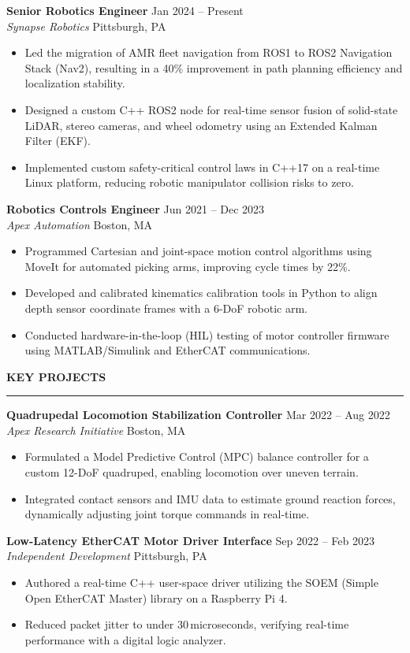 \documentclass[10pt,letterpaper]{article}
\newcommand{\cvsection}[1]{%
  \vspace{6pt}%
  \phantomsection
  {\color{accent}\large\bfseries\MakeUppercase{#1}}%
  \vspace{1pt}%
  \par\noindent\textcolor{accent}{\rule{\linewidth}{1pt}}%
  \vspace{4pt}%
}
\newcommand{\cventry}[4]{%
  \noindent
  \begin{minipage}[t]{\linewidth}
    \textbf{#1} \hfill {\color{secondary}\small #2} \\
    \textit{#3} \hfill {\color{secondary}\small #4}
  \end{minipage}%
  \vspace{2pt}%
}
\begin{document}
\cventry{Senior Robotics Engineer}{Jan 2024 -- Present}{Synapse Robotics}{Pittsburgh, PA}
\begin{itemize}
  \item Led the migration of AMR fleet navigation from ROS1 to ROS2 Navigation Stack (Nav2), resulting in a 40\% improvement in path planning efficiency and localization stability.
  \item Designed a custom C++ ROS2 node for real-time sensor fusion of solid-state LiDAR, stereo cameras, and wheel odometry using an Extended Kalman Filter (EKF).
  \item Implemented custom safety-critical control laws in C++17 on a real-time Linux platform, reducing robotic manipulator collision risks to zero.
\end{itemize}

\cventry{Robotics Controls Engineer}{Jun 2021 -- Dec 2023}{Apex Automation}{Boston, MA}
\begin{itemize}
  \item Programmed Cartesian and joint-space motion control algorithms using MoveIt for automated picking arms, improving cycle times by 22\%.
  \item Developed and calibrated kinematics calibration tools in Python to align depth sensor coordinate frames with a 6-DoF robotic arm.
  \item Conducted hardware-in-the-loop (HIL) testing of motor controller firmware using MATLAB/Simulink and EtherCAT communications.
\end{itemize}

\cvsection{Key Projects}

\cventry{Quadrupedal Locomotion Stabilization Controller}{Mar 2022 -- Aug 2022}{Apex Research Initiative}{Boston, MA}
\begin{itemize}
  \item Formulated a Model Predictive Control (MPC) balance controller for a custom 12-DoF quadruped, enabling locomotion over uneven terrain.
  \item Integrated contact sensors and IMU data to estimate ground reaction forces, dynamically adjusting joint torque commands in real-time.
\end{itemize}

\cventry{Low-Latency EtherCAT Motor Driver Interface}{Sep 2022 -- Feb 2023}{Independent Development}{Pittsburgh, PA}
\begin{itemize}
  \item Authored a real-time C++ user-space driver utilizing the SOEM (Simple Open EtherCAT Master) library on a Raspberry Pi 4.
  \item Reduced packet jitter to under 30\,microseconds, verifying real-time performance with a digital logic analyzer.
\end{itemize}
\end{document}
